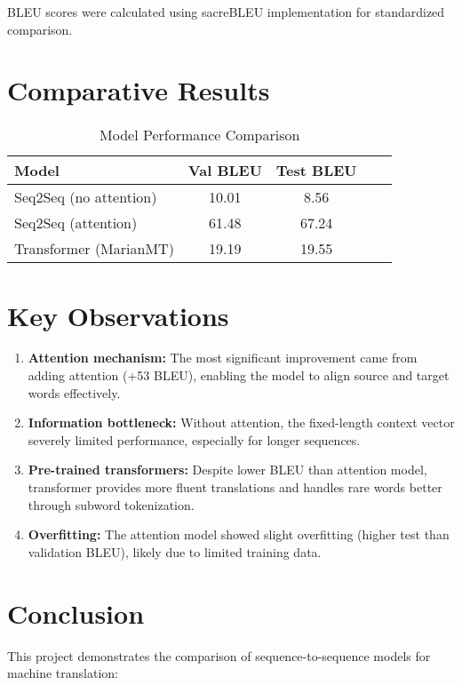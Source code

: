 \documentclass[12pt]{article}
\begin{document}
BLEU scores were calculated using sacreBLEU implementation for standardized comparison.

\section{Comparative Results}

\begin{table}[H]
\centering
\caption{Model Performance Comparison}
\begin{tabular}{|l|c|c|c|c|}
\hline
\textbf{Model} & \textbf{Val BLEU} & \textbf{Test BLEU}\\
\hline
Seq2Seq (no attention) & 10.01 & 8.56\\
Seq2Seq (attention) & 61.48 & 67.24\\
Transformer (MarianMT) & 19.19 & 19.55\\
\hline
\end{tabular}
\end{table}



\section{Key Observations}

\begin{enumerate}
    \item \textbf{Attention mechanism:} The most significant improvement came from adding attention (+53 BLEU), enabling the model to align source and target words effectively.
    
    \item \textbf{Information bottleneck:} Without attention, the fixed-length context vector severely limited performance, especially for longer sequences.
    
    \item \textbf{Pre-trained transformers:} Despite lower BLEU than attention model, transformer provides more fluent translations and handles rare words better through subword tokenization.
    
    \item \textbf{Overfitting:} The attention model showed slight overfitting (higher test than validation BLEU), likely due to limited training data.
    
\end{enumerate}

\section{Conclusion}
This project demonstrates the comparison of sequence-to-sequence models for machine translation:
\end{document}
